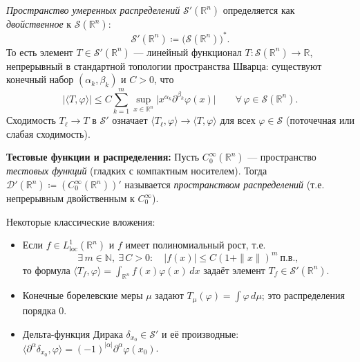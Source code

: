 \documentclass[../NDCNNAI_main.tex]{subfiles}
\begin{document}
\begin{definition}\label{def:tempered_simple}
\emph{Пространство умеренных распределений} \(\mathcal{S}'(\mathbb{R}^n)\) определяется как
\emph{двойственное} к \(\mathcal{S}(\mathbb{R}^n)\):
\[
\mathcal{S}'(\mathbb{R}^n)\coloneq\bigl(\mathcal{S}(\mathbb{R}^n)\bigr)^*.
\]
То есть элемент \(T\in\mathcal{S}'(\mathbb{R}^n)\) --- линейный функционал \(T:\mathcal{S}(\mathbb{R}^n)\to\mathbb{R}\),
непрерывный в стандартной топологии пространства Шварца: существуют конечный набор \((\alpha_k,\beta_k)\) и \(C>0\), что
\[
|\langle T,\varphi\rangle| \le C\sum_{k=1}^m
\sup_{x\in\mathbb{R}^n}\bigl|x^{\alpha_k}\partial^{\beta_k}\varphi(x)\bigr|
\qquad \forall\,\varphi\in\mathcal{S}(\mathbb{R}^n).
\]
Сходимость \(T_\ell\to T\) в \(\mathcal{S}'\) означает \(\langle T_\ell,\varphi\rangle\to \langle T,\varphi\rangle\) для всех \(\varphi\in\mathcal{S}\) (поточечная или слабая сходимость).
\end{definition}

\textbf{Тестовые функции и распределения:}
Пусть \(C_0^\infty(\mathbb{R}^n)\) --- пространство \emph{тестовых функций} (гладких с компактным носителем).
Тогда \(\mathcal{D}'(\mathbb{R}^n)\coloneq(C_0^\infty(\mathbb{R}^n))'\) называется \emph{пространством распределений}
(т.е. непрерывным двойственным к \(C_0^\infty\)).

\begin{example}
Некоторые классические вложения:
\begin{itemize}
  \item Если \(f\in L^1_{\mathrm{loc}}(\mathbb R^n)\) и \(f\) имеет полиномиальный рост, т.е.
\[
\exists\,m\in\mathbb N,\ \exists\,C>0:\quad |f(x)|\le C(1+\|x\|)^m\ \text{п.в.},
\]
то формула \(\langle T_f,\varphi\rangle=\int_{\mathbb R^n} f(x)\varphi(x)\,dx\) задаёт элемент
\(T_f\in\mathcal S'(\mathbb R^n)\).
  \item Конечные борелевские меры \(\mu\) задают \(T_\mu(\varphi)=\int \varphi\,d\mu\); это распределения порядка \(0\).
  \item Дельта-функция Дирака \(\delta_{x_0}\in \mathcal{S}'\) и её производные:
  \(\langle \partial^\alpha\delta_{x_0},\varphi\rangle = (-1)^{|\alpha|}\partial^\alpha\varphi(x_0)\).
\end{itemize}
\end{example}
\end{document}
